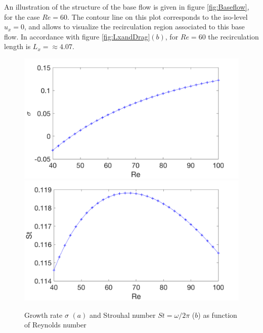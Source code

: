 \documentclass[twocolumn,10pt]{asme2ej}
\begin{document}
An illustration of the structure of the base flow is given in figure \ref{fig:Baseflow},  for the case $Re = 60$. The contour line on this plot corresponds to the iso-level $u_x = 0$, and allows to visualize the recirculation region associated to this base flow. In accordance with figure \ref{fig:LxandDrag}$(b)$, for $Re = 60$ the recirculation length is $L_x = \approx 4.07$.









\begin{figure}
\includegraphics[width=.9 \linewidth]{Cylinder_Sigma_Re.png}
\includegraphics[width=.9 \linewidth]{Cylinder_Strouhal_Re.png}
\caption{Growth rate $\sigma$ $(a)$  and Strouhal number $St = \omega/2\pi$ ($b$) as function of Reynolds number}
\label{fig:SigmaOmega}
\end{figure}
\end{document}
